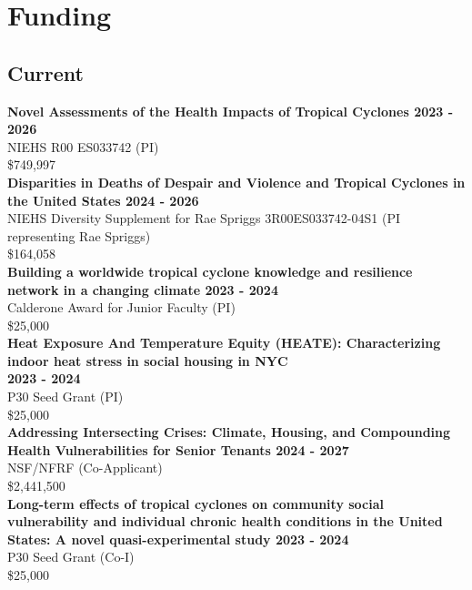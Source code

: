 \section*{Funding}

\subsection*{Current}

\noindent \textbf{Novel Assessments of the Health Impacts of Tropical Cyclones \hfill 2023 - 2026}\\ 
NIEHS R00 ES033742 (PI)\\ 
\$749,997 \\

\noindent \textbf{Disparities in Deaths of Despair and Violence and Tropical Cyclones in the United States \hfill 2024 - 2026}\\ 
NIEHS Diversity Supplement for Rae Spriggs 3R00ES033742-04S1 (PI representing Rae Spriggs)\\ 
\$164,058 \\

\noindent \textbf{Building a worldwide tropical cyclone knowledge and resilience network in a changing climate \hfill 2023 - 2024}\\
Calderone Award for Junior Faculty (PI)\\
\$25,000 \\

\noindent \textbf{Heat Exposure And Temperature Equity (HEATE): Characterizing indoor heat stress in social housing in NYC \\ \hfill 2023 - 2024}\\
P30 Seed Grant (PI)\\
\$25,000 \\

\noindent \textbf{Addressing Intersecting Crises: Climate, Housing, and Compounding Health Vulnerabilities for Senior Tenants \hfill 2024 - 2027} \\
NSF/NFRF (Co-Applicant)\\
\$2,441,500 \\

\noindent \textbf{Long-term effects of tropical cyclones on community social vulnerability and individual chronic health conditions in the United States: A novel quasi-experimental study \hfill 2023 - 2024 } \\
P30 Seed Grant (Co-I)\\
\$25,000 \\

